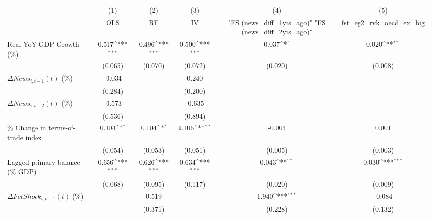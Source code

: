 {
\def\sym#1{\ifmmode^{#1}\else\(^{#1}\)\fi}
\begin{tabular}{l*{5}{c}}
\toprule
                    &\multicolumn{1}{c}{(1)}&\multicolumn{1}{c}{(2)}&\multicolumn{1}{c}{(3)}&\multicolumn{1}{c}{(4)}&\multicolumn{1}{c}{(5)}\\
                    &\multicolumn{1}{c}{OLS}&\multicolumn{1}{c}{RF}&\multicolumn{1}{c}{IV}&\multicolumn{1}{c}{ "FS (news_diff_1yrs_ago)"  "FS (news_diff_2yrs_ago)" }&\multicolumn{1}{c}{fst_eg2_rvk_oecd_ex_big}\\
\midrule
Real YoY GDP Growth (\%)&       0.517\sym{***}&       0.496\sym{***}&       0.500\sym{***}&       0.037\sym{*}  &       0.020\sym{**} \\
                    &     (0.065)         &     (0.070)         &     (0.072)         &     (0.020)         &     (0.008)         \\
\addlinespace
$ \Delta News_{i,t-1}(t)$ (\%)&      -0.034         &                     &       0.240         &                     &                     \\
                    &     (0.284)         &                     &     (0.200)         &                     &                     \\
\addlinespace
$ \Delta News_{i,t-2}(t)$ (\%)&      -0.573         &                     &      -0.635         &                     &                     \\
                    &     (0.536)         &                     &     (0.894)         &                     &                     \\
\addlinespace
\% Change in terms-of-trade index&       0.104\sym{*}  &       0.104\sym{*}  &       0.106\sym{**} &      -0.004         &       0.001         \\
                    &     (0.054)         &     (0.053)         &     (0.051)         &     (0.005)         &     (0.003)         \\
\addlinespace
Lagged primary balance (\% GDP)&       0.656\sym{***}&       0.626\sym{***}&       0.634\sym{***}&       0.043\sym{**} &       0.030\sym{***}\\
                    &     (0.068)         &     (0.095)         &     (0.117)         &     (0.020)         &     (0.009)         \\
\addlinespace
$ \Delta FctShock_{i,t-1}(t)$ (\%)&                     &       0.519         &                     &       1.940\sym{***}&      -0.084         \\
                    &                     &     (0.371)         &                     &     (0.228)         &     (0.132)         \\

\end{tabular}}
